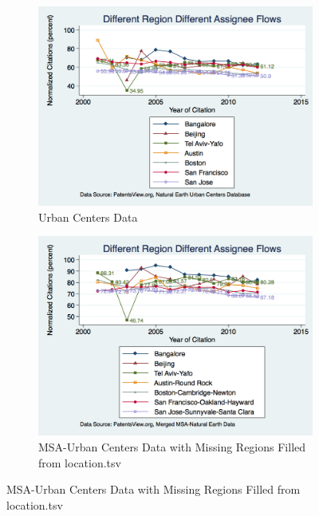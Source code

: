\documentclass[12pt]{article}
\begin{document}
\begin{figure}
  \begin{subfigure}[b]{\textwidth}
    \includegraphics[width=\textwidth]{UCDiffRegionDiffAssigneeFlows}
    \caption{Urban Centers Data}
    \label{fig:UCDiffRegionDiffAssigneeFlows}
  \end{subfigure}
  
  \begin{subfigure}[b]{\textwidth}
    \includegraphics[width=\textwidth]{DiffRegionDiffAssigneeFlows}
    \caption{MSA-Urban Centers Data with Missing Regions Filled from location.tsv}
    \label{fig:DiffRegionDiffAssigneeFlows}
  \end{subfigure}
\end{figure}
\end{document}
